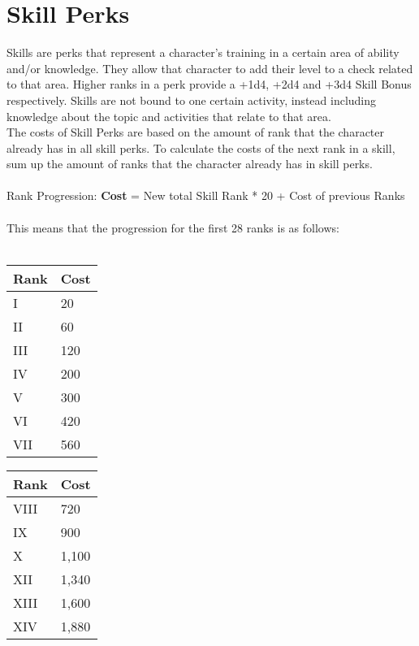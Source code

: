 \chapter{Skill Perks}\label{ch:skillPerks}
Skills are perks that represent a character's training in a certain area of ability and/or knowledge.
They allow that character to add their level to a check related to that area.
Higher ranks in a perk provide a +1d4, +2d4 and +3d4 Skill Bonus respectively.
Skills are not bound to one certain activity, instead including knowledge about the topic and activities that relate to that area.\\
The costs of Skill Perks are based on the amount of rank that the character already has in all skill perks.
To calculate the costs of the next rank in a skill, sum up the amount of ranks that the character already has in skill perks.\\
\\
Rank Progression: \textbf{Cost} = New total Skill Rank * 20 + Cost of previous Ranks\\
\\
This means that the progression for the first 28 ranks is as follows:\\
\\
\begin{minipage}{0.25\textwidth}
    \begin{tabular}{l | l}
        Rank & Cost\\ \hline
        I & 20\\
        II & 60\\
        III & 120\\
        IV & 200\\
        V & 300\\
        VI & 420\\
        VII & 560\\
    \end{tabular}
\end{minipage}
\begin{minipage}{0.25\textwidth}
    \begin{tabular}{l | l}
        Rank & Cost\\ \hline
        VIII & 720\\
        IX & 900\\
        X & 1,100\\
        XII & 1,340\\
        XIII & 1,600\\
        XIV & 1,880\\
    \end{tabular}
\end{minipage}
